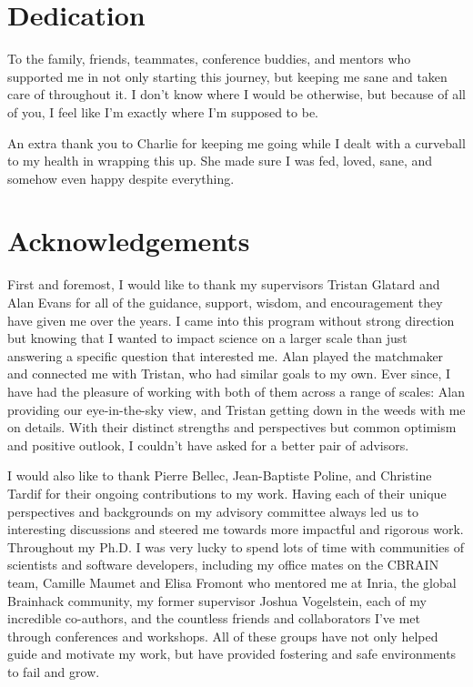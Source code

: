 \documentclass[fleqn,12pt]{SelfArx} %
\affiliation{\textit{Biological \& Biomedical Engineering, McGill University, Montréal, QC, Canada}}
\begin{document}
\flushbottom %
\makethesistitle %
\onecolumn

\beginfront
\clearpage
{}
\section{Dedication}
To the family, friends, teammates, conference buddies, and mentors who supported me in not only starting this journey,
but keeping me sane and taken care of throughout it. I don't know where I would be otherwise, but because of all of
you, I feel like I'm exactly where I'm supposed to be.

An extra thank you to Charlie for keeping me going while I dealt with a curveball to my health in wrapping this up. She
made sure I was fed, loved, sane, and somehow even happy despite everything.
\clearpage

\section{Acknowledgements}
First and foremost, I would like to thank my supervisors Tristan Glatard and Alan Evans for all of the guidance,
support, wisdom, and encouragement they have given me over the years. I came into this program without strong direction
but knowing that I wanted to impact science on a larger scale than just answering a specific question that interested
me. Alan played the matchmaker and connected me with Tristan, who had similar goals to my own. Ever since, I have had
the pleasure of working with both of them across a range of scales: Alan providing our eye-in-the-sky view, and Tristan
getting down in the weeds with me on details. With their distinct strengths and perspectives but common optimism and
positive outlook, I couldn't have asked for a better pair of advisors.

I would also like to thank Pierre Bellec, Jean-Baptiste Poline, and Christine Tardif for their ongoing contributions to
my work. Having each of their unique perspectives and backgrounds on my advisory committee always led us to interesting
discussions and steered me towards more impactful and rigorous work. Throughout my Ph.D. I was very lucky to spend lots
of time with communities of scientists and software developers, including my office mates on the CBRAIN team, Camille
Maumet and Elisa Fromont who mentored me at Inria, the global Brainhack community, my former supervisor Joshua
Vogelstein, each of my incredible co-authors, and the countless friends and collaborators I've met through conferences
and workshops. All of these groups have not only helped guide and motivate my work, but have provided fostering and
safe environments to fail and grow.
\end{document}
